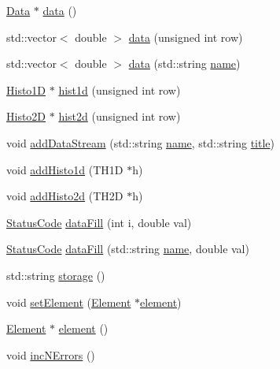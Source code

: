 \begin{DoxyCompactItemize}
\item 
\hyperlink{classData}{Data} $\ast$ \hyperlink{classProcessus_a16e45f329fbce935aeef0ff3cb508228}{data} ()
\item 
std\+::vector$<$ double $>$ \hyperlink{classProcessus_aa7c57483cf4b9ab0b2d0ae2de8316402}{data} (unsigned int row)
\item 
std\+::vector$<$ double $>$ \hyperlink{classProcessus_abf4d91fb36707e1d50178bab12d21ae9}{data} (std\+::string \hyperlink{classObject_a300f4c05dd468c7bb8b3c968868443c1}{name})
\item 
\hyperlink{classHisto1D}{Histo1D} $\ast$ \hyperlink{classProcessus_a409227db936baff03c0462c1bcfe8069}{hist1d} (unsigned int row)
\item 
\hyperlink{classHisto2D}{Histo2D} $\ast$ \hyperlink{classProcessus_a73b5118cb5f2b5eaad33286183b86cfc}{hist2d} (unsigned int row)
\item 
void \hyperlink{classProcessus_a308c8f193802f1d1ab49d4447d0cb281}{add\+Data\+Stream} (std\+::string \hyperlink{classObject_a300f4c05dd468c7bb8b3c968868443c1}{name}, std\+::string \hyperlink{classObject_a73a0f1a41828fdd8303dd662446fb6c3}{title})
\item 
void \hyperlink{classProcessus_ad46e0d4dfdfdcbce001ee6be1746dfa4}{add\+Histo1d} (T\+H1D $\ast$h)
\item 
void \hyperlink{classProcessus_ac1ed1aed5edaeabdf18aa56775440471}{add\+Histo2d} (T\+H2D $\ast$h)
\item 
\hyperlink{classStatusCode}{Status\+Code} \hyperlink{classProcessus_a0d093b48f3218a088ba030e24372f18c}{data\+Fill} (int i, double val)
\item 
\hyperlink{classStatusCode}{Status\+Code} \hyperlink{classProcessus_aa31ab71711f7af6a729441ff573f69c9}{data\+Fill} (std\+::string \hyperlink{classObject_a300f4c05dd468c7bb8b3c968868443c1}{name}, double val)
\item 
std\+::string \hyperlink{classProcessus_a33fa1a0b54a636e5cdd680669fd9ea51}{storage} ()
\item 
void \hyperlink{classProcessus_a8ddef94227d83d9dae2cd49aebc33353}{set\+Element} (\hyperlink{classElement}{Element} $\ast$\hyperlink{classProcessus_a6fe155527431a7190b7d44d600b9608d}{element})
\item 
\hyperlink{classElement}{Element} $\ast$ \hyperlink{classProcessus_a6fe155527431a7190b7d44d600b9608d}{element} ()
\item 
void \hyperlink{classProcessus_abe603d0636f76db6aa6c5c60cf34c591}{inc\+N\+Errors} ()
\item 

\end{DoxyCompactItemize}
